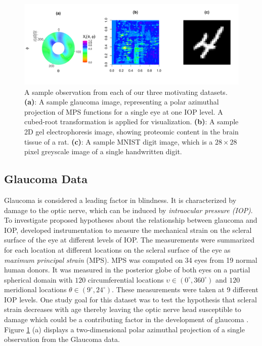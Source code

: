 \begin{figure}
    \centering
    \includegraphics[width=1\linewidth]{figures/data-plot.pdf}
    \caption{
    A sample observation from each of our three motivating datasets.
    \textbf{(a)}: A sample glaucoma image, representing a polar azimuthal projection of MPS functions for a single eye at one IOP level. A cubed-root transformation is applied for visualization.
    \textbf{(b)}: A sample 2D gel electrophoresis image, showing proteomic content in the brain tissue of a rat.
    \textbf{(c)}: A sample MNIST digit image, which is a $28 \times 28$ pixel greyscale image of a single handwritten digit.}
    \label{fig:combined-data-objects}
\end{figure}



\subsection{Glaucoma Data}

Glaucoma is considered a leading factor in blindness. It is characterized by damage to the optic nerve, which can be induced by \emph{intraocular pressure (IOP)}. 
To investigate proposed hypotheses about the relationship between glaucoma and IOP, \textcite{fazio_age-related_2014} developed instrumentation to measure the mechanical strain on the scleral surface of the eye at different levels of IOP. 
The measurements were summarized for each location at different locations on the scleral surface of the eye as \emph{maximum principal strain} (MPS). MPS was computed on 34 eyes from 19 normal human donors. It was measured in the posterior globe of both eyes on a partial spherical domain with $120$ circumferential locations $\upsilon \in (0^{\circ}, 360^{\circ})$ and $120$ meridional locations $\theta \in (9^{\circ}, 24^{\circ})$.
These measurements were taken at 9 different IOP levels.
One study goal for this dataset was to test the hypothesis that scleral strain decreases with age thereby leaving the optic nerve head susceptible to damage which could be a contributing factor in the development of glaucoma \parencite{lee_bayesian_2019}.
Figure \ref{fig:combined-data-objects} (a) displays a two-dimensional polar azimuthal projection of a single observation from the Glaucoma data.

